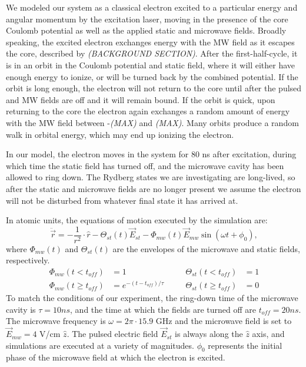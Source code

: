 \documentclass[aps,pra,preprint,groupedaddress]{revtex4-1}
\begin{document}
We modeled our system as a classical electron excited to a particular energy and angular momentum by the excitation laser, moving in the presence of the core Coulomb potential as well as the applied static and microwave fields. Broadly speaking, the excited electron exchanges energy with the MW field as it escapes the core, described by \emph{(BACKGROUND SECTION)}. After the first-half-cycle, it is in an orbit in the Coulomb potential and static field, where it will either have enough energy to ionize, or will be turned back by the combined potential. If the orbit is long enough, the electron will not return to the core until after the pulsed and MW fields are off and it will remain bound. If the orbit is quick, upon returning to the core the electron again exchanges a random amount of energy with the MW field between -\emph{(MAX)} and \emph{(MAX)}. Many orbits produce a random walk in orbital energy, which may end up ionizing the electron.

In our model, the electron moves in the system for 80 ns after excitation, during which time the static field has turned off, and the microwave cavity has been allowed to ring down. The Rydberg states we are investigating are long-lived, so after the static and microwave fields are no longer present we assume the electron will not be disturbed from whatever final state it has arrived at.

In atomic units, the equations of motion executed by the simulation are:
\begin{equation}
\ddot{\vec{r}} = -\frac{1}{r^2} \cdot \hat{r} - \Theta_{st}(t) \vec{E}_{st} - \Phi_{mw}(t) \vec{E}_{mw} \sin{(\omega t + \phi_0)},
\end{equation}
where $\Phi_{mw}(t)$ and $\Theta_{st}(t)$ are the envelopes of the microwave and static fields, respectively.
\begin{align}
\Phi_{mw}(t<t_{off}) & = 1 & \quad & \Theta_{st}(t<t_{off}) & = 1 \\
\Phi_{mw}(t \geq t_{off}) & = e^{-(t-t_{off})/\tau} & \quad & \Theta_{st}(t \geq t_{off}) & = 0
\end{align}
To match the conditions of our experiment, the ring-down time of the microwave cavity is $\tau = 10 ns$, and the time at which the fields are turned off are $t_{off} = 20 ns$. The microwave frequency is $\omega = 2\pi \cdot 15.9$ GHz and the microwave field is set to $\vec{E}_{mw} = 4$ V/cm $\hat{z}$. The pulsed electric field $\vec{E}_{st}$ is always along the $\hat{z}$ axis, and simulations are executed at a variety of magnitudes. $\phi_0$ represents the initial phase of the microwave field at which the electron is excited.
\end{document}
